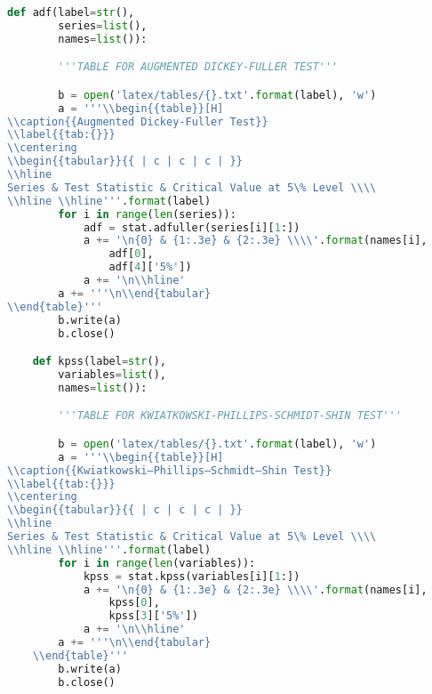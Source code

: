 \begin{lstlisting}[language=Python]
    def adf(label=str(),
        series=list(),
        names=list()):

        '''TABLE FOR AUGMENTED DICKEY-FULLER TEST'''

        b = open('latex/tables/{}.txt'.format(label), 'w')
        a = '''\\begin{{table}}[H]
\\caption{{Augmented Dickey-Fuller Test}}
\\label{{tab:{}}}
\\centering
\\begin{{tabular}}{{ | c | c | c | }}
\\hline
Series & Test Statistic & Critical Value at 5\% Level \\\\
\\hline \\hline'''.format(label)
        for i in range(len(series)):
            adf = stat.adfuller(series[i][1:])
            a += '\n{0} & {1:.3e} & {2:.3e} \\\\'.format(names[i],
                adf[0],
                adf[4]['5%'])
            a += '\n\\hline'
        a += '''\n\\end{tabular}
\\end{table}'''
        b.write(a)
        b.close()

    def kpss(label=str(),
        variables=list(),
        names=list()):

        '''TABLE FOR KWIATKOWSKI-PHILLIPS-SCHMIDT-SHIN TEST'''

        b = open('latex/tables/{}.txt'.format(label), 'w')
        a = '''\\begin{{table}}[H]
\\caption{{Kwiatkowski–Phillips–Schmidt–Shin Test}}
\\label{{tab:{}}}
\\centering
\\begin{{tabular}}{{ | c | c | c | }}
\\hline
Series & Test Statistic & Critical Value at 5\% Level \\\\
\\hline \\hline'''.format(label)
        for i in range(len(variables)):
            kpss = stat.kpss(variables[i][1:])
            a += '\n{0} & {1:.3e} & {2:.3e} \\\\'.format(names[i],
                kpss[0],
                kpss[3]['5%'])
            a += '\n\\hline'
        a += '''\n\\end{tabular}
    \\end{table}'''
        b.write(a)
        b.close()


\end{lstlisting}
